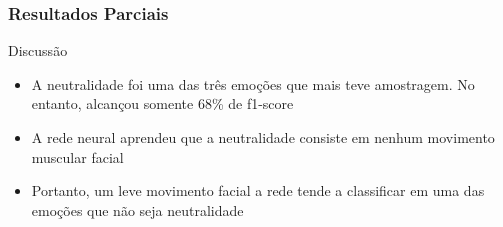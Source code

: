 \documentclass{beamer}
\begin{document}
\begin{frame}
\frametitle{Resultados Parciais}
 \begin{block}{Discussão}
\begin{itemize}
\item A neutralidade foi uma das três emoções que mais teve amostragem. No entanto, alcançou somente 68\% de f1-score
\pause
\item A rede neural aprendeu que a neutralidade consiste em nenhum movimento muscular facial
\pause
\item Portanto, um leve movimento facial a rede tende a classificar em uma das emoções que não seja neutralidade
\end{itemize}
\end{block}
\end{frame}
\end{document}
